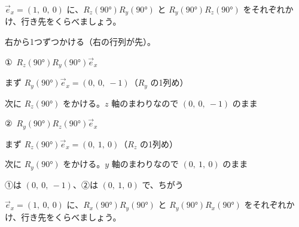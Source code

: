 \begin{reidai}[回す順番を変える]
$\vec e_x=(1,\ 0,\ 0)$ に、$R_z(90°)R_y(90°)$ と $R_y(90°)R_z(90°)$ をそれぞれかけ、行き先をくらべましょう。\par
\kangaekata 右から1つずつかける（右の行列が先）。\par
\shiki ①\ $R_z(90°)R_y(90°)\vec e_x$\par
\kviihq まず $R_y(90°)\vec e_x=(0,\ 0,\ -1)$（$R_y$ の1列め）\par
\kviihq 次に $R_z(90°)$ をかける。$z$ 軸のまわりなので $(0,\ 0,\ -1)$ のまま\par
\kviihq ②\ $R_y(90°)R_z(90°)\vec e_x$\par
\kviihq まず $R_z(90°)\vec e_x=(0,\ 1,\ 0)$（$R_z$ の1列め）\par
\kviihq 次に $R_y(90°)$ をかける。$y$ 軸のまわりなので $(0,\ 1,\ 0)$ のまま\par
\kotae ①は $(0,\ 0,\ -1)$、②は $(0,\ 1,\ 0)$ で、ちがう
\end{reidai}

\begin{jibun}
$\vec e_x=(1,\ 0,\ 0)$ に、$R_x(90°)R_y(90°)$ と $R_y(90°)R_x(90°)$ をそれぞれかけ、行き先をくらべましょう。
\end{jibun}

